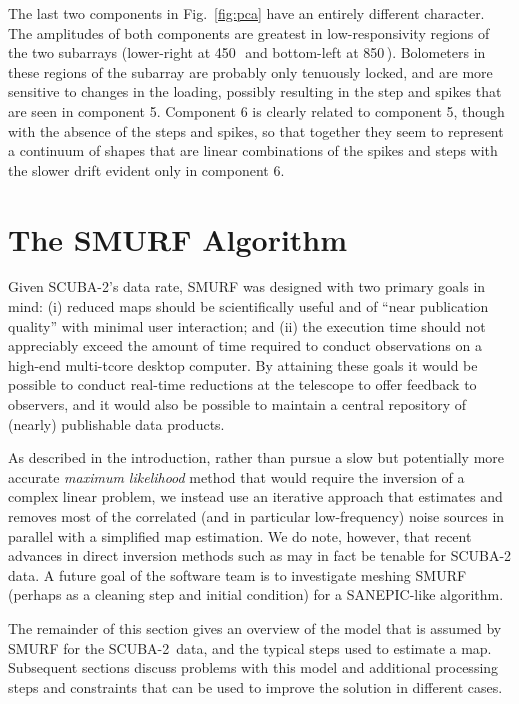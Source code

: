 \documentclass[useAMS,usenatbib,nofootinbib]{mn2e}
\newcommand{\scuba}{SCUBA-2}
\begin{document}
The last two components in Fig.~\ref{fig:pca} have an entirely
different character. The amplitudes of both components are greatest in
low-responsivity regions of the two subarrays (lower-right at
450\,\micron\ and bottom-left at 850\,\micron). Bolometers in these
regions of the subarray are probably only tenuously locked, and are
more sensitive to changes in the loading, possibly resulting in the
step and spikes that are seen in component 5. Component 6 is clearly
related to component 5, though with the absence of the steps and
spikes, so that together they seem to represent a continuum of shapes
that are linear combinations of the spikes and steps with the slower
drift evident only in component 6.

\section{The SMURF Algorithm}
\label{sec:algorithm}

Given \scuba's data rate, SMURF was designed with two primary goals in
mind: (i) reduced maps should be scientifically useful and of ``near
publication quality'' with minimal user interaction; and (ii) the
execution time should not appreciably exceed the amount of time
required to conduct observations on a high-end multi-tcore desktop
computer. By attaining these goals it would be possible to conduct
real-time reductions at the telescope to offer feedback to observers,
and it would also be possible to maintain a central repository of
(nearly) publishable data products.

As described in the introduction, rather than pursue a slow but
potentially more accurate \emph{maximum likelihood} method that would
require the inversion of a complex linear problem, we instead use an
iterative approach that estimates and removes most of the correlated
(and in particular low-frequency) noise sources in parallel with a
simplified map estimation. We do note, however, that recent advances
in direct inversion methods such as \citet{patanchon2008} may in fact
be tenable for SCUBA-2 data. A future goal of the software team is to
investigate meshing SMURF (perhaps as a cleaning step and initial
condition) for a SANEPIC-like algorithm.

The remainder of this section gives an overview of the model that is
assumed by SMURF for the \scuba\ data, and the typical steps used to
estimate a map. Subsequent sections discuss problems with this model
and additional processing steps and constraints that can be used to
improve the solution in different cases.
\end{document}
